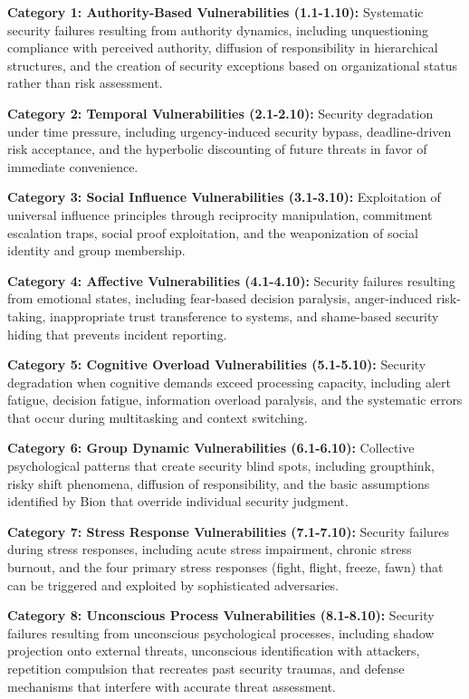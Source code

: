 \documentclass[10pt, twocolumn]{article}
\begin{document}
\textbf{Category 1: Authority-Based Vulnerabilities (1.1-1.10):} Systematic security failures resulting from authority dynamics, including unquestioning compliance with perceived authority, diffusion of responsibility in hierarchical structures, and the creation of security exceptions based on organizational status rather than risk assessment.

\textbf{Category 2: Temporal Vulnerabilities (2.1-2.10):} Security degradation under time pressure, including urgency-induced security bypass, deadline-driven risk acceptance, and the hyperbolic discounting of future threats in favor of immediate convenience.

\textbf{Category 3: Social Influence Vulnerabilities (3.1-3.10):} Exploitation of universal influence principles through reciprocity manipulation, commitment escalation traps, social proof exploitation, and the weaponization of social identity and group membership.

\textbf{Category 4: Affective Vulnerabilities (4.1-4.10):} Security failures resulting from emotional states, including fear-based decision paralysis, anger-induced risk-taking, inappropriate trust transference to systems, and shame-based security hiding that prevents incident reporting.

\textbf{Category 5: Cognitive Overload Vulnerabilities (5.1-5.10):} Security degradation when cognitive demands exceed processing capacity, including alert fatigue, decision fatigue, information overload paralysis, and the systematic errors that occur during multitasking and context switching.

\textbf{Category 6: Group Dynamic Vulnerabilities (6.1-6.10):} Collective psychological patterns that create security blind spots, including groupthink, risky shift phenomena, diffusion of responsibility, and the basic assumptions identified by Bion that override individual security judgment.

\textbf{Category 7: Stress Response Vulnerabilities (7.1-7.10):} Security failures during stress responses, including acute stress impairment, chronic stress burnout, and the four primary stress responses (fight, flight, freeze, fawn) that can be triggered and exploited by sophisticated adversaries.

\textbf{Category 8: Unconscious Process Vulnerabilities (8.1-8.10):} Security failures resulting from unconscious psychological processes, including shadow projection onto external threats, unconscious identification with attackers, repetition compulsion that recreates past security traumas, and defense mechanisms that interfere with accurate threat assessment.
\end{document}
